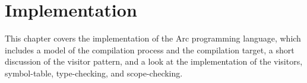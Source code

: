 \chapter{Implementation}\label{cha:implementation}
This chapter covers the implementation of the Arc programming language, which includes a model of the compilation process and the compilation target, a short discussion of the visitor pattern, and a look at the implementation of the visitors, symbol-table, type-checking, and scope-checking.














